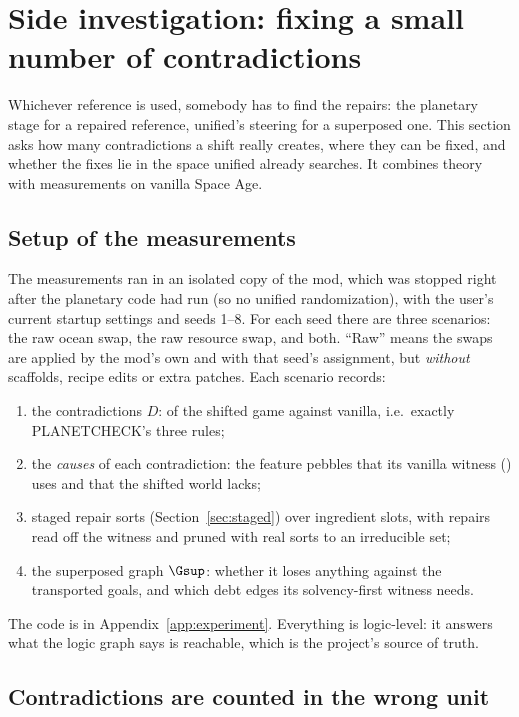 \section{Side investigation: fixing a small number of contradictions}\label{sec:repair}

Whichever reference is used, somebody has to find the repairs: the planetary stage for a repaired reference, unified's steering for a superposed one. This section asks how many contradictions a shift really creates, where they can be fixed, and whether the fixes lie in the space unified already searches. It combines theory with measurements on vanilla Space Age.

\subsection{Setup of the measurements}

The measurements ran in an isolated copy of the mod, which was stopped right after the planetary code had run (so no unified randomization), with the user's current startup settings and seeds 1--8. For each seed there are three scenarios: the raw ocean swap, the raw resource swap, and both. ``Raw'' means the swaps are applied by the mod's own  and  with that seed's assignment, but \emph{without} scaffolds, recipe edits or extra patches. Each scenario records:
\begin{enumerate}[nosep]
\item the contradictions $D$:  of the shifted game against vanilla, i.e.\ exactly PLANETCHECK's three rules;
\item the \emph{causes} of each contradiction: the feature pebbles that its vanilla witness () uses and that the shifted world lacks;
\item staged repair sorts (Section~\ref{sec:staged}) over ingredient slots, with repairs read off the witness and pruned with real sorts to an irreducible set;
\item the superposed graph $\Gsup$: whether it loses anything against the transported goals, and which debt edges its solvency-first witness needs.
\end{enumerate}
The code is in Appendix~\ref{app:experiment}. Everything is logic-level: it answers what the logic graph says is reachable, which is the project's source of truth.

\subsection{Contradictions are counted in the wrong unit}

